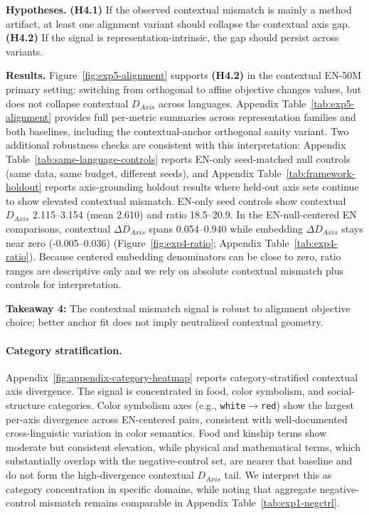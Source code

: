 \documentclass[11pt]{article}
\begin{document}
\textbf{Hypotheses.} \textbf{(H4.1)} If the observed contextual mismatch is mainly a method artifact, at least one alignment variant should collapse the contextual axis gap. \textbf{(H4.2)} If the signal is representation-intrinsic, the gap should persist across variants.

\textbf{Results.} Figure~\ref{fig:exp5-alignment} supports \textbf{(H4.2)} in the contextual EN-50M primary setting: switching from orthogonal to affine objective changes values, but does not collapse contextual $D_{Axis}$ across languages. Appendix Table~\ref{tab:exp5-alignment} provides full per-metric summaries across representation families and both baselines, including the contextual-anchor orthogonal sanity variant. Two additional robustness checks are consistent with this interpretation: Appendix Table~\ref{tab:same-language-controls} reports EN-only seed-matched null controls (same data, same budget, different seeds), and Appendix Table~\ref{tab:framework-holdout} reports axis-grounding holdout results where held-out axis sets continue to show elevated contextual mismatch. EN-only seed controls show contextual $D_{Axis}$ 2.115--3.154 (mean 2.610) and ratio 18.5--20.9. In the EN-null-centered EN comparisons, contextual $\Delta D_{Axis}$ spans 0.054--0.940 while embedding $\Delta D_{Axis}$ stays near zero (-0.005--0.036) (Figure~\ref{fig:exp4-ratio}; Appendix Table~\ref{tab:exp4-ratio}). Because centered embedding denominators can be close to zero, ratio ranges are descriptive only and we rely on absolute contextual mismatch plus controls for interpretation.

\begin{insightbox}
\textbf{Takeaway 4:} The contextual mismatch signal is robust to alignment objective choice; better anchor fit does not imply neutralized contextual geometry.
\end{insightbox}
\vspace{-3pt}

\paragraph{Category stratification.} Appendix~\ref{fig:appendix-category-heatmap} reports category-stratified contextual axis divergence. The signal is concentrated in food, color symbolism, and social-structure categories. Color symbolism axes (e.g., \texttt{white}$\rightarrow$\texttt{red}) show the largest per-axis divergence across EN-centered pairs, consistent with well-documented cross-linguistic variation in color semantics. Food and kinship terms show moderate but consistent elevation, while physical and mathematical terms, which substantially overlap with the negative-control set, are nearer that baseline and do not form the high-divergence contextual $D_{Axis}$ tail. We interpret this as category concentration in specific domains, while noting that aggregate negative-control mismatch remains comparable in Appendix Table~\ref{tab:exp1-negctrl}.
\end{document}
